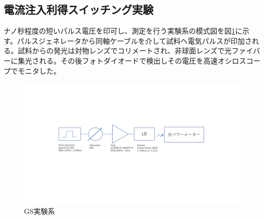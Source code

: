 \subsection{電流注入利得スイッチング実験}%
ナノ秒程度の短いパルス電圧を印可し、測定を行う実験系の模式図を図\ref{fig:GS_setup}に示す。パルスジェネレータから同軸ケーブルを介して試料へ電気パルスが印加される。試料からの発光は対物レンズでコリメートされ、非球面レンズで光ファイバーに集光される。その後フォトダイオードで検出しその電圧を高速オシロスコープでモニタした。

\begin{figure}[htbp]
	\includegraphics[width=15cm]{figure/fig_2_3_1_01_GS_setup.pdf}
	\caption{GS実験系}
	\label{fig:GS_setup}
\end{figure}

